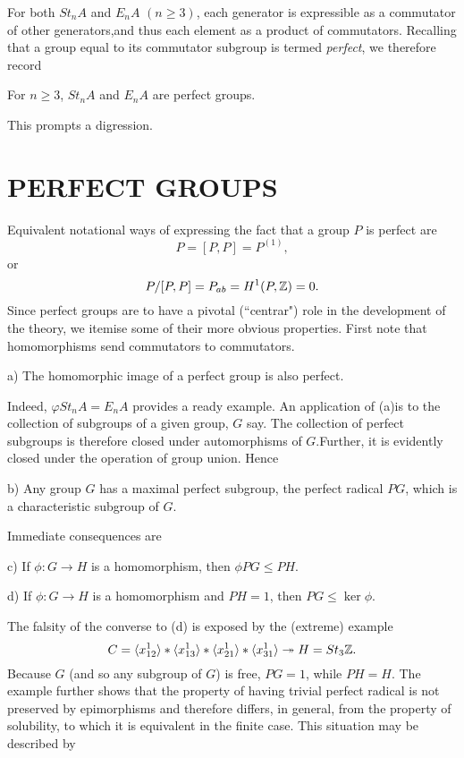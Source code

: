 For both $St_nA$ and $E_nA$ $(n\geqslant 3)$, each generator is expressible as a commutator of other generators,and thus each element as a product of commutators. Recalling that a group equal to its commutator subgroup is termed {\em perfect}, we therefore record
\begin{prop}
	For $n \geqslant 3$, $St_n A$ and $E_n A$ are perfect groups.
\end{prop}
This prompts a digression.
\section*{PERFECT GROUPS}
Equivalent notational ways of expressing the fact that a group $P$ is perfect are
\[P=[P,P]=P^{(1)},\]
or
\[P/[P,P]=P_{ab}=H^1(P,\mathbb{Z})=0.\]
Since perfect groups are to have a pivotal (``centrar") role in the development of the theory, we itemise some of their more obvious properties. First note that homomorphisms send commutators to commutators.
\begin{prop}
a) The homomorphic image of a perfect group is also perfect.
\end{prop}
Indeed, $\varphi St_nA=E_nA$ provides a ready example. An application of (a)is to the collection of subgroups of a given group, $G$ say. The collection of perfect subgroups is therefore closed under automorphisms of $G$.Further, it is evidently closed under the operation of group union. Hence
\begin{prop}
b) Any group $G$ has a maximal perfect subgroup, the perfect radical $PG$, which is a characteristic subgroup of $G$.
\end{prop}
Immediate consequences are
\begin{prop}\label{1.4}
c) If $\phi\colon  G \rightarrow H$ is a homomorphism, then $\phi PG \leqslant PH$.
\end{prop}
\begin{prop}
d) If $\phi\colon  G \rightarrow H$ is a homomorphism and $ PH= 1$, then  $PG \leqslant \ker \phi$.
\end{prop}
The falsity of the converse to (d) is exposed by the (extreme) example
\[C=\langle x_{12}^1\rangle *\langle x_{13}^1\rangle *\langle x_{21}^1\rangle *\langle x_{31}^1\rangle \twoheadrightarrow H=St_3\mathbb{Z}.\]
Because $G$ (and so any subgroup of $G$) is free, $PG=1$, while $PH=H$. The example further shows that the property of having trivial perfect radical is not preserved by epimorphisms and therefore differs, in general, from the property of solubility, to which it is equivalent in the finite case. This situation may be described by
